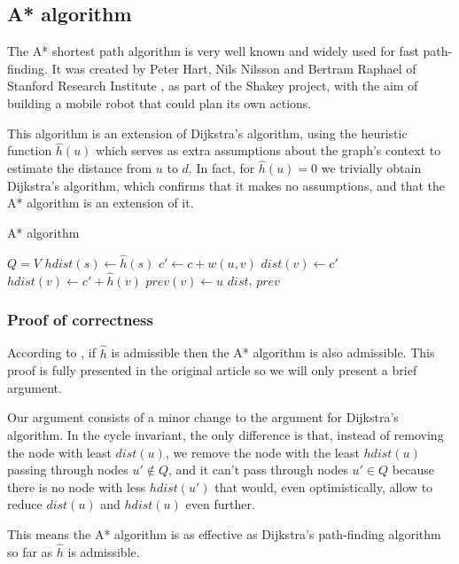 \subsection{A* algorithm} \label{algorithm-shortestpath-astar}
The A* shortest path algorithm is very well known and widely used for fast path-finding. It was created by Peter Hart, Nils Nilsson and Bertram Raphael of Stanford Research Institute \cite{Astar}, as part of the Shakey project, with the aim of building a mobile robot that could plan its own actions.\par
This algorithm is an extension of Dijkstra's algorithm, using the heuristic function $\hat{h}(u)$ which serves as extra assumptions about the graph's context to estimate the distance from $u$ to $d$. In fact, for $\hat{h}(u) = 0$ we trivially obtain Dijkstra's algorithm, which confirms that it makes no assumptions, and that the A* algorithm is an extension of it.
\begin{algorithm}[H]
    \caption{A* algorithm}
    \label{alg-astar}
    \begin{algorithmic}[1]
             
            \EndFor
            \State $Q = V$
            \State $hdist(s) \gets \hat{h}(s)$
             
                    \State $c' \gets c + w(u, v)$
                        \State $dist(v) \gets c'$
                        \State $hdist(v) \gets c'+\hat{h}(v)$
                        \State $prev(v) \gets u$
                    \EndIf
                \EndFor
            \EndWhile
            \State \Return $dist$, $prev$
        \EndFunction
    \end{algorithmic}
\end{algorithm}
\subsubsection{Proof of correctness}
According to \cite{Astar}, if $\hat{h}$ is \gls{admissible} then the A* algorithm is also \gls{admissible}. This proof is fully presented in the original article so we will only present a brief argument.\par
Our argument consists of a minor change to the argument for Dijkstra's algorithm. In the cycle invariant, the only difference is that, instead of removing the node with least $dist(u)$, we remove the node with the least $hdist(u)$ passing through nodes $u' \not \in Q$, and it can't pass through nodes $u' \in Q$ because there is no node with less $hdist(u')$ that would, even optimistically, allow to reduce $dist(u)$ and $hdist(u)$ even further.\par
This means the A* algorithm is as effective as Dijkstra's path-finding algorithm so far as $\hat{h}$ is admissible.
